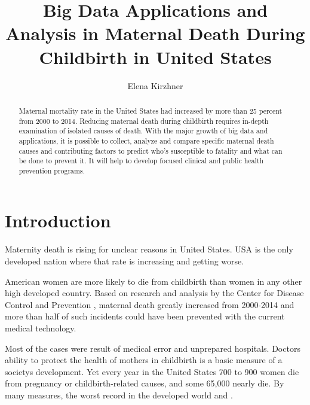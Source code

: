 \documentclass[sigconf]{acmart}
\begin{document}
\title{Big Data Applications and Analysis in Maternal Death During Childbirth in United States}


\author{Elena Kirzhner}


\begin{abstract}

Maternal mortality rate in the United States had increased by more than 25 percent from 2000 to 2014. Reducing maternal death during childbirth requires in-depth examination of isolated causes of death. With the major growth of big data and applications, it is possible to collect, analyze and compare specific maternal death causes and contributing factors to predict who's susceptible to fatality and what can be done to prevent it. It will help to develop focused clinical and public health prevention programs.
\end{abstract}


\maketitle

\section{Introduction}

Maternity death is rising for unclear reasons in United States. USA is the only developed nation where that rate is increasing and getting worse.
 
American women are more likely to die from childbirth than women in any other high developed country. Based on research and analysis by the Center for Disease Control and Prevention \cite{bacak2006state}, maternal death greatly increased from 2000-2014 and more than half of such incidents could have been prevented with the current medical technology.

Most of the cases were result of medical error and unprepared hospitals. Doctor\textquotesingle s ability to protect the health of mothers in childbirth is a basic measure of a society\textquotesingle s development. Yet every year in the United States 700 to 900 women die from pregnancy or childbirth-related causes, and some 65,000 nearly die. By many measures, the worst record in the developed world \cite{world2012trends} and \cite{amnesty2010deadly}.
\end{document}
